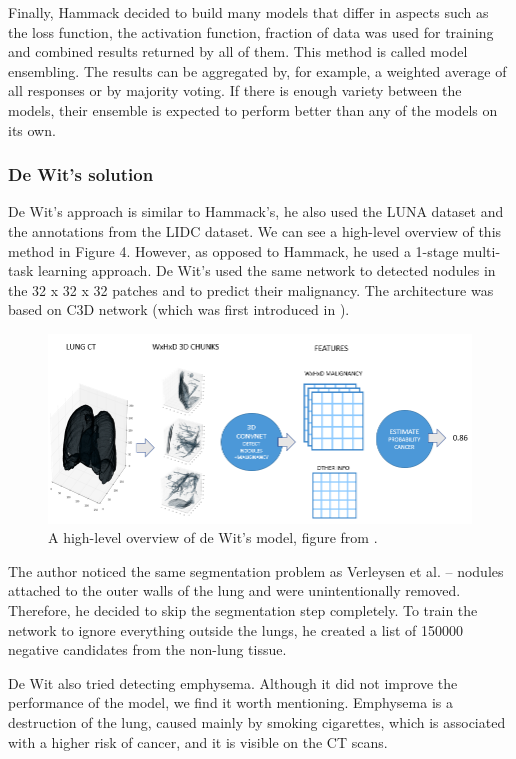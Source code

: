 \documentclass[12pt]{article}
\begin{document}
Finally, Hammack decided to build many models that differ in aspects such as the loss function, the activation function, fraction of data was used for training and combined results returned by all of them. This method is called model ensembling. The results can be aggregated by, for example, a weighted average of all responses or by majority voting. If there is enough variety between the models, their ensemble is expected to perform better than any of the models on its own.

\subsubsection{De Wit's solution}
De Wit's approach is similar to Hammack's, he also used the LUNA dataset and the annotations from the LIDC dataset. We can see a high-level overview of this method in Figure 4. However, as opposed to Hammack, he used a 1-stage multi-task learning approach. De Wit's used the same network to detected nodules in the 32 x 32 x 32 patches and to predict their malignancy. The architecture was based on C3D network (which was first introduced in \citep{jia2014caffe}).
\begin{figure}[h!]
\centering
\includegraphics[scale = 0.45]{julian.png}
\caption{A high-level overview of de Wit's model, figure from \citep{dewit}. }
\end{figure}


The author noticed the same segmentation problem as Verleysen et al. \--- nodules attached to the outer walls of the lung and were unintentionally removed. Therefore, he decided to skip the segmentation step completely. To train the network to ignore everything outside the lungs, he created a list of 150000 negative candidates from the non-lung tissue.

De Wit also tried detecting emphysema. Although it did not improve the performance of the model, we find it worth mentioning. Emphysema is a destruction of the lung, caused mainly by smoking cigarettes, which is associated with a higher risk of cancer, and it is visible on the CT scans.   
\end{document}
